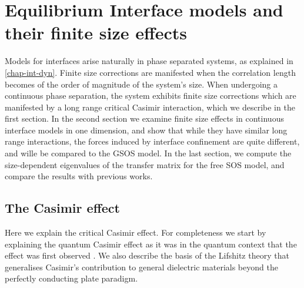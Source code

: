 \chapter{Equilibrium Interface models and their finite size effects}

Models for interfaces arise naturally in phase separated systems, as explained in \ref{chap-int-dyn}.  Finite size corrections are manifested when the correlation length becomes of the order of magnitude of the system's size. When undergoing a continuous phase separation, the system exhibits finite size corrections which are manifested by a long range critical Casimir interaction, which we describe in the first section. In the second section we examine finite size effects in continuous interface models in one dimension, and show that while they have similar long range interactions, the forces induced by interface confinement are quite different, and wille be compared to the GSOS model. In  the last section, we compute the size-dependent eigenvalues of the transfer matrix for the free SOS model, and compare the results with previous works.

    \section{The Casimir effect}
    
Here we explain the critical Casimir effect. For completeness we start by explaining the quantum Casimir effect as it was in the quantum context that the effect was first observed \cite{h_b_g_casimir_attraction_1948}.
We also describe the basis of the Lifshitz theory that generalises Casimir's contribution to 
general dielectric materials beyond the perfectly conducting plate paradigm.
    
